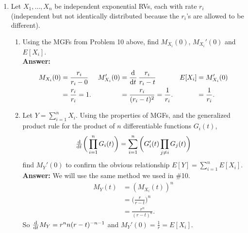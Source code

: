 \documentclass{article}
\begin{document}
\begin{enumerate}
        \item Let $X_1, \ldots, X_n$  be independent exponential RVs, each with rate $r_i$ (independent but not identically distributed because the $r_i$’s are allowed to be different).
        \begin{enumerate}
            \item Using the MGFs from Problem 10 above, find $M_{X_i} (0), \, M_{X_i}' (0)$ and $E[X_i]$.\\
            \textbf{Answer: }
                \begin{align*}
                    M_{X_i}(0) &= \frac{r_i}{r_i-0}     &       M_{X_i}'(0) &= \dod{}{t}\frac{r_i}{r_i-t}     &       E[X_i] &= M_{X_i}'(0)\\
                    &= \frac{r_i}{r_i} = 1.     &       &= \frac{r_i}{(r_i-t)^2} = \frac{1}{r_i}.      &         &= \frac{1}{r_i}.
                \end{align*}
            
            \item Let $Y = \sum_{i=1}^n X_i$. Using the properties of MGFs, and the generalized product rule for the product of $n$ differentiable functions $G_i(t)$,
                \[\od{}{t}\bigg(\prod_{i=1}^n G_i(t)\bigg) = \sum_{i=1}^n\bigg(G_i'(t)\prod_{j\neq i}  G_j(t) \bigg)\]
            find $M_Y'(0)$ to confirm the obvious relationship $E[Y] = \sum_{i=1}^n E[X_i]$.\\
            \textbf{Answer: }We will use the same method we used in \#10.
                \begin{align*}
                    M_Y(t) &= (M_{X_i}(t))^n\\
                    &= \bigg(\frac{r}{r-t}\bigg)^n\\
                    &= \frac{r^n}{(r-t)^n}.
                \end{align*}
            So $\od{}{t}M_Y = r^nn(r-t)^{-n-1}$ and $M_Y'(0) = \frac{1}{r} = E[X_i]$.
        \end{enumerate}
        
    \end{enumerate}
\end{document}
